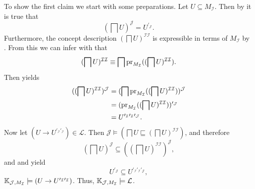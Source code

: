 \begin{Proof}
  To show the first claim we start with some preparations.  Let $U \subseteq
  M_{\mathcal{I}}$.  Then by  it is true that
  \begin{equation}
    \label{eq:29}
    (\bigsqcap U)^{\mathcal{J}} = U^{\prime_{\mathcal{J}}}.
  \end{equation}
  Furthermore, the concept description $(\bigsqcap U)^{\mathcal{I}\mathcal{I}}$ is
  expressible in terms of $M_{\mathcal{I}}$ by
  .  From this we can infer with
   that
  \begin{equation*}
    (\bigsqcap U)^{\mathcal{I}\mathcal{I}} \equiv \bigsqcap
    \operatorname{pr}_{M_{\mathcal{I}}}((\bigsqcap U)^{\mathcal{I}\mathcal{I}}).
  \end{equation*}
  Then  yields
  \begin{equation}
    \label{eq:30}
    \begin{aligned}
      ((\bigsqcap U)^{\mathcal{I}\mathcal{I}})^{\mathcal{J}}
      &= (\bigsqcap \operatorname{pr}_{M_{\mathcal{I}}}((\bigsqcap
      U)^{\mathcal{I}\mathcal{I}}))^{\mathcal{J}} \\
      &= (\operatorname{pr}_{M_{\mathcal{I}}}((\bigsqcap
      U)^{\mathcal{I}\mathcal{I}}))^{\prime_{\mathcal{J}}} \\
      &= U^{\prime_{\mathcal{I}}\prime_{\mathcal{I}}\prime_{\mathcal{J}}}.
    \end{aligned}
  \end{equation}
  Now let $(U \to U^{\prime_{\mathcal{I}}\prime_{\mathcal{I}}}) \in \mathcal{L}$.  Then
  $\mathcal{J} \models (\bigsqcap U \sqsubseteq (\bigsqcap U)^{\mathcal{I}\mathcal{I}})$,
  and therefore
  \begin{equation*}
    (\bigsqcap U)^{\mathcal{J}} \subseteq ((\bigsqcap U)^{\mathcal{I}\mathcal{I}})^{\mathcal{J}},
  \end{equation*}
  and  and  yield
  \begin{equation*}
    U^{\prime_{\mathcal{J}}} \subseteq U^{\prime_{\mathcal{I}}\prime_{\mathcal{I}}\prime_{\mathcal{J}}},
  \end{equation*}
  \ie ${\mathbb{K}}_{\mathcal{J}, M_{\mathcal{I}}} \models (U \to
  U^{\prime_{\mathcal{I}}\prime_{\mathcal{I}}})$.  Thus, ${\mathbb{K}}_{\mathcal{J},
    M_{\mathcal{I}}} \models \mathcal{L}$.


\end{Proof}

